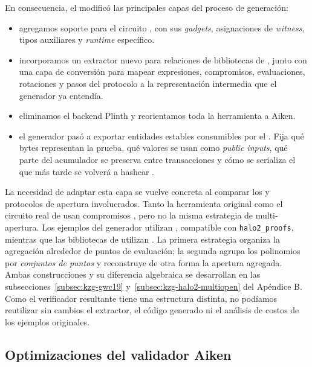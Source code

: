 En consecuencia, el \fork modificó las principales capas del proceso de generación:
\begin{itemize}[noitemsep]
	\item agregamos soporte para el circuito \MidnightSTMCircuit, con sus \textit{gadgets}, asignaciones de \textit{witness}, tipos auxiliares y \textit{runtime} específico.
	\item incorporamos un extractor nuevo para relaciones de bibliotecas de \Midnight, junto con una capa de conversión para mapear expresiones, compromisos, evaluaciones, rotaciones y pasos del protocolo a la representación intermedia que el generador ya entendía.
	\item eliminamos el backend Plinth y reorientamos toda la herramienta a Aiken.
	\item el generador pasó a exportar entidades estables consumibles por el \zkBridge. Fija qué bytes representan la prueba, qué valores se usan como \textit{public inputs}, qué parte del acumulador se preserva entre transacciones y cómo se serializa el \ReducedRedeemer que más tarde se volverá a hashear \Onchain.
\end{itemize}

La necesidad de adaptar esta capa se vuelve concreta al comparar los \PCS y protocolos de apertura involucrados. Tanto la herramienta original como el circuito real de \Mithril usan compromisos \KZG \cite{Kate2010}, pero no la misma estrategia de multi-apertura. Los ejemplos del generador utilizan \GWCNineteen, compatible con \texttt{halo2\_proofs}, mientras que las bibliotecas de \Midnight utilizan \HaloTwoMultiOpen. La primera estrategia organiza la agregación alrededor de puntos de evaluación; la segunda agrupa los polinomios por \emph{conjuntos de puntos} y reconstruye de otra forma la apertura agregada. Ambas construcciones y su diferencia algebraica se desarrollan en las subsecciones~\ref{subsec:kzg-gwc19} y~\ref{subsec:kzg-halo2-multiopen} del Apéndice B. Como el verificador resultante tiene una estructura distinta, no podíamos reutilizar sin cambios el extractor, el código generado ni el análisis de costos de los ejemplos originales.

\subsection{Optimizaciones del validador Aiken}
\label{subsec:mithril-a-cardano-optimizaciones-del-validador-aiken}

